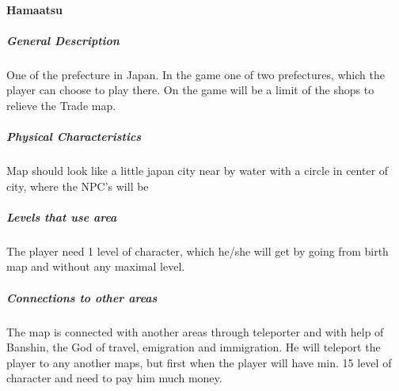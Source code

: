 \documentclass[parskip=full]{scrartcl}
\begin{document}
					\paragraph{Hamaatsu}\vspace{-0.5cm}
						\subparagraph{General Description} \vspace{-0.5cm}
							\par \begingroup
							\leftskip=2cm
							\noindent
									One of the prefecture in Japan. In the game one of two prefectures, which the player can choose to play there. On the game will be a limit of the shops to relieve the Trade map. 
							\par \endgroup
						\subparagraph{Physical Characteristics} \vspace{-0.5cm}
							\par \begingroup
							\leftskip=2cm
							\noindent
									Map should look like a little japan city near by water with a circle in center of city, where the NPC's will be
							\par \endgroup
						\subparagraph{Levels that use area} \vspace{-0.5cm}
							\par \begingroup
							\leftskip=2cm
							\noindent
									The player need 1 level of character, which he/she will get by going from birth map and without any maximal level. 
							\par \endgroup
						\subparagraph{Connections to other areas} \vspace{-0.5cm}
							\par \begingroup
							\leftskip=2cm
							\noindent
									The map is connected with another areas through teleporter and with help of Banshin, the God of travel, emigration and immigration. He will teleport the player to any another maps, but first when the player will have min. 15 level of character and need to pay him much money. 
							\par \endgroup
\end{document}
